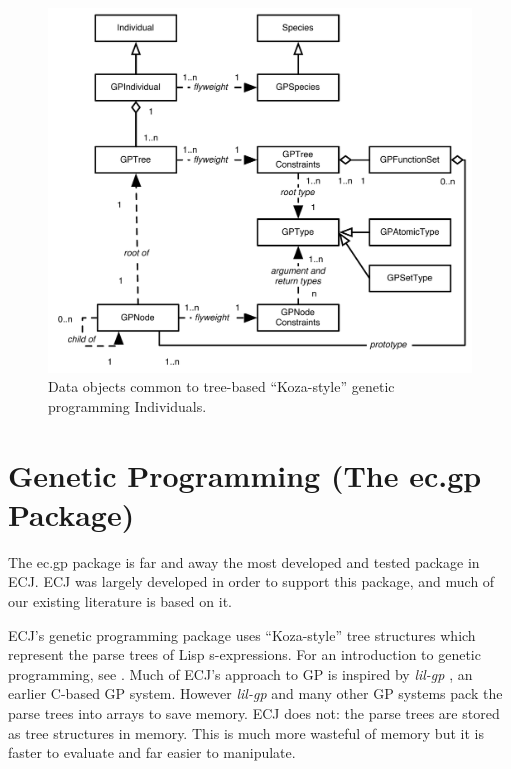 \documentclass[twoside,10pt]{book}
\newcommand\package[1]{\index{#1}\textsf{#1}}
\begin{document}
\begin{figure}
\begin{center}
\includegraphics[width=6.5in]{GP.pdf}
\end{center}
\caption{Data objects common to tree-based ``Koza-style'' genetic programming Individuals.}
\label{GP}
\end{figure}


\section{Genetic Programming (The \package{ec.gp} Package)}
\label{ec.gp}

The \package{ec.gp} package is far and away the most developed and tested package in ECJ.  ECJ was largely developed in order to support this package, and much of our existing literature is based on it.

ECJ's genetic programming package uses ``Koza-style'' tree structures \cite{koza:book,koza:gp2} which represent the parse trees of Lisp s-expressions.   For an introduction to genetic programming, see \cite{poli08:fieldguide}.  Much of ECJ's approach to GP is inspired by {\it lil-gp} \cite{lilgp}, an earlier C-based GP system.  However {\it lil-gp} and many other GP systems pack the parse trees into arrays to save memory.  ECJ does not: the parse trees are stored as tree structures in memory.  This is much more wasteful of memory but it is faster to evaluate and far easier to manipulate.
\end{document}

